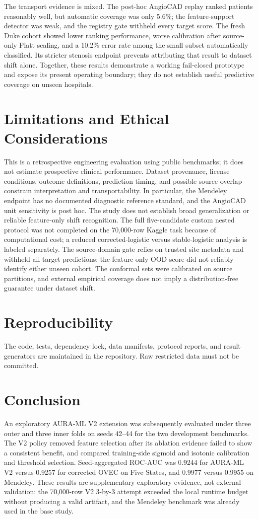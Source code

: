 \documentclass[12pt]{article}
\begin{document}
The transport evidence is mixed. The post-hoc AngioCAD replay ranked patients
reasonably well, but automatic coverage was only 5.6\%; the feature-support
detector was weak, and the registry gate withheld every target score. The
fresh Duke cohort showed lower ranking performance, worse calibration after
source-only Platt scaling, and a 10.2\% error rate among the small subset
automatically classified. Its stricter stenosis endpoint prevents attributing
that result to dataset shift alone. Together, these results demonstrate a
working fail-closed prototype and expose its present operating boundary; they
do not establish useful predictive coverage on unseen hospitals.

\section{Limitations and Ethical Considerations}
This is a retrospective engineering evaluation using public benchmarks; it
does not estimate prospective clinical performance. Dataset provenance,
license conditions, outcome definitions, prediction timing, and possible source
overlap constrain interpretation and transportability. In particular, the
Mendeley endpoint has no documented diagnostic reference standard, and the
AngioCAD unit sensitivity is post hoc. The study does not establish broad
generalization or reliable feature-only shift recognition. The full
five-candidate custom nested protocol was not
completed on the 70,000-row Kaggle task because of computational cost; a
reduced corrected-logistic versus stable-logistic analysis is labeled
separately. The source-domain gate relies on trusted site metadata and
withheld all target predictions; the feature-only OOD score did not reliably
identify either unseen cohort. The conformal sets were calibrated on source
partitions, and external empirical coverage does not imply a distribution-free
guarantee under dataset shift.

\section{Reproducibility}
The code, tests, dependency lock, data manifests, protocol reports, and result
generators are maintained in the repository. Raw restricted data must not be
committed.

\section{Conclusion}
An exploratory AURA-ML V2 extension was subsequently evaluated under three
outer and three inner folds on seeds 42--44 for the two development benchmarks.
The V2 policy removed feature selection after its ablation evidence failed to
show a consistent benefit, and compared training-side sigmoid and isotonic
calibration and threshold selection. Seed-aggregated ROC-AUC was 0.9244 for
AURA-ML V2 versus 0.9257 for corrected OVEC on Five States, and 0.9977 versus
0.9955 on Mendeley. These results are supplementary exploratory evidence, not
external validation: the 70,000-row V2 3-by-3 attempt exceeded the local
runtime budget without producing a valid artifact, and the Mendeley benchmark
was already used in the base study.
\end{document}
